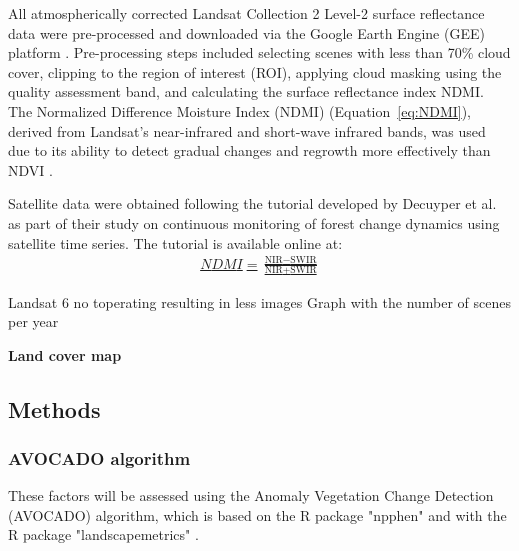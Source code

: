All atmospherically corrected Landsat Collection 2 Level-2 surface reflectance data were pre-processed and downloaded via the Google Earth Engine (GEE) platform \citep{gorelickGoogleEarthEngine2017}. Pre-processing steps included selecting scenes with less than 70\% cloud cover, clipping to the region of interest (ROI), applying cloud masking using the quality assessment band, and calculating the surface reflectance index NDMI. The Normalized Difference Moisture Index (NDMI) (Equation~\ref{eq:NDMI}), derived from Landsat's near-infrared and short-wave infrared bands, was used due to its ability to detect gradual changes and regrowth more effectively than NDVI \citep{vermotePreliminaryAnalysisPerformance2016}.

Satellite data were obtained following the tutorial developed by Decuyper et al. as part of their study on continuous monitoring of forest change dynamics using satellite time series. The tutorial is available online at:
\href{https://www.pucv.cl/uuaa/labgrs/proyectos/tutorial-to-the-anomaly-vegetation-change-detection-avocado}

\begin{align}
\label{eq:NDMI}
NDMI = \frac{\text{NIR} - \text{SWIR}}{\text{NIR} + \text{SWIR}}
\end{align}

Landsat 6 no toperating resulting in less images
Graph with the number of scenes per year



\textbf{Land cover map}\\



\subsection{Methods}

\subsubsection{AVOCADO algorithm}
These factors will be assessed using the Anomaly Vegetation Change Detection (AVOCADO) algorithm, which is based on the R package "npphen" and with the R package "landscapemetrics" \citep{decuyperContinuousMonitoringForest2022, chavez2017npphen, hesselbarth2019landscapemetrics}. 


